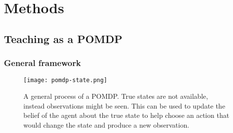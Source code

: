 

\section{Methods}

\subsection{Teaching as a POMDP}

\subsubsection{General framework}


\begin{figure}
    \centering
    \texttt{[image: pomdp-state.png]}
    \caption{A general process of a POMDP. True states are not available, instead observations might be seen. This can be used to update the belief of the agent about the true state to help choose an action that would change the state and produce a new observation.}
    \label{fig:pomdp}
\end{figure}


